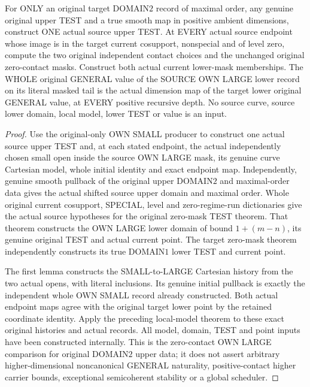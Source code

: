 \begin{theorem}
\label{hir:original-zero-own-large-full-smooth-values}
\leanok
For ONLY an original target DOMAIN$2$ record of maximal order, any genuine
original upper TEST and a true smooth map in positive ambient dimensions,
construct ONE actual source upper TEST. At EVERY actual source endpoint whose
image is in the target current cosupport, nonspecial and of level zero,
compute the two original independent contact choices and the unchanged
original zero-contact masks. Construct both actual current lower-mask
memberships. The WHOLE original GENERAL value of the SOURCE OWN LARGE lower
record on its literal masked tail is the actual dimension map of the target
lower original GENERAL value, at EVERY positive recursive depth. No source
curve, source lower domain, local model, lower TEST or value is an input.
\end{theorem}
\begin{proof}
Use the original-only OWN SMALL producer to construct one actual source
upper TEST and, at each stated endpoint, the actual independently chosen
small open inside the source OWN LARGE mask, its genuine curve Cartesian
model, whole initial identity and exact endpoint map. Independently, genuine
smooth pullback of the original upper DOMAIN$2$ and maximal-order data gives
the actual shifted source upper domain and maximal order. Whole original
current cosupport, SPECIAL, level and zero-regime-run dictionaries give the
actual source hypotheses for the original zero-mask TEST theorem. That theorem
constructs the OWN LARGE lower domain of bound $1+(m-n)$, its genuine original
TEST and actual current point. The target zero-mask theorem independently
constructs its true DOMAIN$1$ lower TEST and current point.

The first lemma constructs the SMALL-to-LARGE Cartesian history from the two
actual opens, with literal inclusions. Its genuine initial pullback is exactly
the independent whole OWN SMALL record already constructed. Both actual
endpoint maps agree with the original target lower point by the retained
coordinate identity. Apply the preceding local-model theorem to these exact
original histories and actual records. All model, domain, TEST and point
inputs have been constructed internally. This is the zero-contact OWN LARGE
comparison for original DOMAIN$2$ upper data; it does not assert arbitrary
higher-dimensional noncanonical GENERAL naturality, positive-contact higher
carrier bounds, exceptional semicoherent stability or a global scheduler.
\end{proof}
